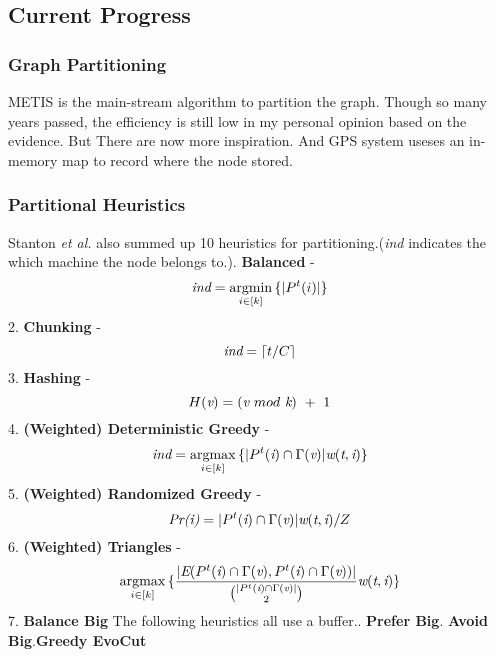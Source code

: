 \documentclass{article}
\DeclareMathOperator*{\argmin}{argmin}
\DeclareMathOperator*{\argmax}{argmax}
\begin{document}
	\subsection{Current Progress}
	\subsubsection{Graph Partitioning}
	METIS\cite{metis} is the main-stream algorithm to partition the graph. Though so many years passed, the efficiency is still low in my personal opinion based on the evidence\cite{salihoglu2013gps:}. But There are now more inspiration. And GPS system useses an in-memory map to record where the node stored.
	\subsubsection{Partitional Heuristics}
	Stanton \emph{et al.}\cite{stanton2012streaming} also summed up 10 heuristics for partitioning.(\emph{ind} indicates the which machine the node belongs to.). \textbf{Balanced} - \begin{equation} \emph{ind} = \mathop{\argmin}_{i\in[k]}{\{|P^t(i)|\}} \end{equation}
	2. \textbf{Chunking} - \begin{equation} \emph{ind} = \lceil t/C \rceil \end{equation}						%
	3. \textbf{Hashing} - \begin{equation} H(\emph{v}) = (\emph{v}~mod~\emph{k})~+~1 \end{equation}
	4. \textbf{(Weighted) Deterministic Greedy} - \begin{equation} \emph{ind}=\mathop{\argmax}_{i\in[k]}{\{|P^t(\emph{i})\cap\Gamma(\emph{v})|\emph{w}(\emph{t},\emph{i})\}} \end{equation}
	5. \textbf{(Weighted) Randomized Greedy} - \begin{equation} \emph{Pr(i)}=|P^t(\emph{i})\cap\Gamma(\emph{v})|\emph{w}(\emph{t},\emph{i})/Z \end{equation}
	6. \textbf{(Weighted) Triangles} - 
	\begin{equation}
		\mathop{\argmax}_{i\in[k]}{\{\frac{|\emph{E}(P^t(\emph{i})\cap\Gamma(\emph{v}), P^t(\emph{i})\cap\Gamma(\emph{v}))|}
		{\binom{|P^t(\emph{i})\cap\Gamma(\emph{v})|}{2}}\emph{w}(\emph{t},\emph{i})\}}
	\end{equation}
	7. \textbf{Balance Big}
	The following heuristics all use a buffer.. \textbf{Prefer Big}. \textbf{Avoid Big}.\textbf{Greedy EvoCut}\cite{andersen2009finding}
\end{document}
